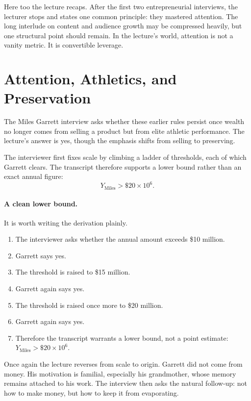 Here too the lecture recaps. After the first two entrepreneurial interviews, the lecturer stops and states one common principle: they mastered attention. The long interlude on content and audience growth may be compressed heavily, but one structural point should remain. In the lecture's world, attention is not a vanity metric. It is convertible leverage.

\section{Attention, Athletics, and Preservation}

The Miles Garrett interview asks whether these earlier rules persist once wealth no longer comes from selling a product but from elite athletic performance. The lecture's answer is yes, though the emphasis shifts from selling to preserving.

The interviewer first fixes scale by climbing a ladder of thresholds, each of which Garrett clears. The transcript therefore supports a lower bound rather than an exact annual figure:
\begin{equation}
Y_{\text{Miles}} > \$20 \times 10^6.
\end{equation}

\paragraph{A clean lower bound.}
It is worth writing the derivation plainly.
\begin{enumerate}
\item The interviewer asks whether the annual amount exceeds \$10 million.
\item Garrett says yes.
\item The threshold is raised to \$15 million.
\item Garrett again says yes.
\item The threshold is raised once more to \$20 million.
\item Garrett again says yes.
\item Therefore the transcript warrants a lower bound, not a point estimate: \(Y_{\text{Miles}} > \$20 \times 10^6\).
\end{enumerate}

Once again the lecture reverses from scale to origin. Garrett did not come from money. His motivation is familial, especially his grandmother, whose memory remains attached to his work. The interview then asks the natural follow-up: not how to make money, but how to keep it from evaporating.

